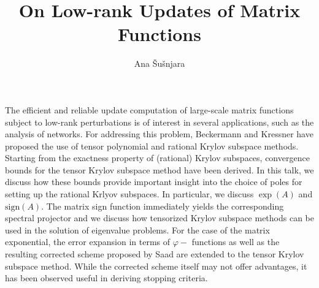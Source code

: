 \documentclass{article}
\title{On Low-rank Updates of Matrix Functions}
\author{Ana \v{S}u\v{s}njara}
\affil{PhD student at EPF Lausanne}
\date{}
\begin{document}
\maketitle

\setcounter{page}{13}
The efficient and reliable update computation of large-scale matrix functions subject to low-rank perturbations is of interest in several applications, such as the analysis of networks. For addressing this problem, Beckermann and Kressner have proposed the use of tensor polynomial and rational Krylov subspace methods. Starting from the exactness property of (rational) Krylov subspaces, convergence bounds for the tensor Krylov subspace method have been derived. In this talk, we discuss how these bounds provide important insight into the choice of poles for setting up the rational Krlyov subspaces. In particular, we discuss $\exp(A)$ and $\textrm{sign}(A)$. The matrix sign function immediately yields the corresponding spectral projector and we discuss how tensorized Krylov subspace methods can be used in the solution of eigenvalue problems. For the case of the matrix exponential, the error expansion in terms of $\varphi-$ functions as well as the resulting corrected scheme proposed by Saad are extended to the tensor Krylov subspace method. While the corrected scheme itself may not offer advantages, it has been observed useful in deriving stopping criteria.  
\end{document}
